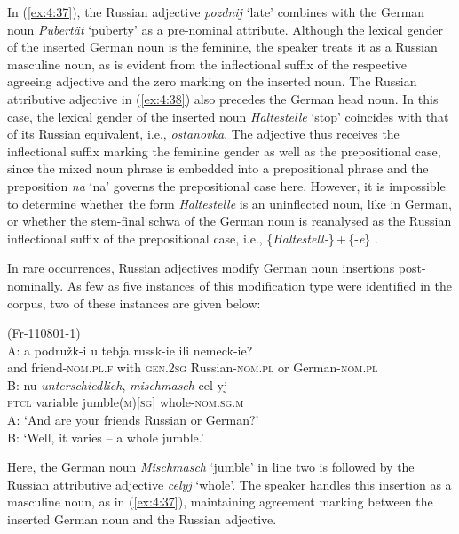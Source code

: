 \noindent In (\ref{ex:4:37}), the Russian adjective \textit{pozdnij} `late' combines with the German noun \textit{Pubertät} `puberty' as a pre-nominal attribute. Although the lexical gender of the inserted German noun is the feminine, the speaker treats it as a Russian masculine noun, as is evident from the inflectional suffix of the respective agreeing adjective and the zero marking on the inserted noun. The Russian attributive adjective in (\ref{ex:4:38}) also precedes the German head noun. In this case, the lexical gender of the inserted noun \textit{Haltestelle} `stop' coincides with that of its Russian equivalent, i.e., \textit{ostanovka}. The adjective thus receives the inflectional suffix marking the feminine gender as well as the prepositional case, since the mixed noun phrase is embedded into a prepositional phrase and the preposition \textit{na} `na' governs the prepositional case here. However, it is impossible to determine whether the form \textit{Haltestelle} is an uninflected noun, like in German, or whether the stem-final schwa of the German noun is reanalysed as the Russian inflectional suffix of the prepositional case, i.e., \{\textit{Haltestell-}\}\,+\,\{{-\textit{e}}\} \citep[cf.][276]{zdan-trubc-01}.

In rare occurrences, Russian adjectives  modify German noun insertions post-nominally. As few as five instances of this modification type were identified in the corpus, two of these instances are given below:

\ea
\label{ex4.41}
(Fr-110801-1)\\
\gll A: a podružk-i u tebja russk-ie ili   nemeck-ie?\\
	{} and friend-\textsc{nom.pl.f} with \textsc{gen.2sg} Russian-\textsc{nom.pl} or  German-\textsc{nom.pl}\\
\glt
\gll B: nu \textit{unterschiedlich}, \textit{mischmasch} cel-yj\\
	{} \textsc{ptcl} variable jumble(\textsc{m})[\textsc{sg}] whole-\textsc{nom.sg.m}\\
\glt
A: `And are your friends Russian or German?'\\
B: `Well, it varies -- a whole jumble.'\\
\z

\noindent Here, the German noun \textit{Mischmasch} `jumble' in line two is followed by the Russian attributive adjective \textit{celyj} `whole'. The speaker handles this insertion as a masculine noun, as in (\ref{ex:4:37}), maintaining agreement marking between the inserted German noun and the Russian adjective.

